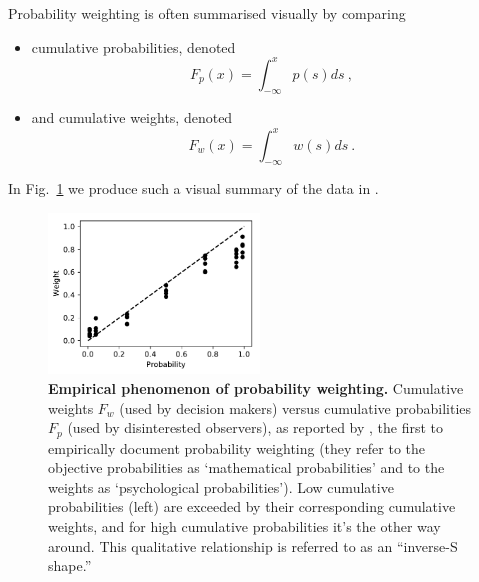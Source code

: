 \documentclass[a4paper, 12pt]{article}
\newcommand{\bi}{\begin{itemize}}
\newcommand{\ei}{\end{itemize}}
\newcommand{\elabel}[1]{\label{eq:#1}}
\newcommand{\flabel}[1]{\label{fig:#1}}
\newcommand{\fref}[1]{Fig.~\ref{fig:#1}}
\newcommand{\be}{\begin{equation}}
\newcommand{\ee}{\end{equation}}
\begin{document}
Probability weighting is often summarised visually by comparing 
\bi
\item cumulative probabilities, denoted 
\be
\elabel{DO_CDF}
F_p(x)=\int_{-\infty}^x p(s) ds~,
\ee
\item and cumulative weights, denoted
\be
\elabel{DM_CDF}
F_w(x)=\int_{-\infty}^x w(s) ds~.
\ee
\ei
In \fref{PB1948} we produce such a visual summary of the data in \textcite[188]{PrestonBaratta1948}.
\begin{figure}[!htb]
\centering
\includegraphics[width=0.5\textwidth]{./figs/PB48_2.pdf}
\caption{\textbf{Empirical phenomenon of probability weighting.} Cumulative weights $F_w$ (used by decision makers) versus cumulative probabilities $F_p$ (used by disinterested observers), as reported by \textcite{PrestonBaratta1948}, the first to empirically document probability weighting (they refer to the objective probabilities as `mathematical probabilities' and to the weights as `psychological probabilities'). 
Low cumulative probabilities (left) are exceeded by their corresponding cumulative weights, and for high cumulative probabilities it's the other way around. This qualitative relationship is referred to as an ``inverse-S shape.''}
\flabel{PB1948}
\end{figure}
\end{document}
